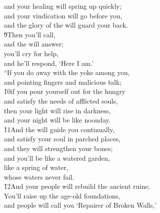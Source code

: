 \begin{poetry}
\poemll    and your healing will spring up quickly; \\
\poeml and your vindication will go before you, \\
\poemll    and the glory of the  will guard your back. \\
\poeml \v{9}Then you'll call, \\
\poemll    and the  will answer; \\
\poeml you'll cry for help, \\
\poemll    and he'll respond, `Here I am.' \\
\poeml ``If you do away with the yoke among you, \\
\poemll    and pointing fingers and malicious talk; \\
\poeml \v{10}if you pour yourself out for the hungry \\
\poemll    and satisfy the needs of afflicted souls, \\
\poeml then your light will rise in darkness, \\
\poemll    and your night will be like noonday. \\
\poeml \v{11}And the  will guide you continually, \\
\poemll    and satisfy your soul in parched places, \\
\poemlll       and they will strengthen your bones; \\
\poeml and you'll be like a watered garden, \\
\poemll    like a spring of water, \\
\poemlll       whose waters never fail. \\
\poeml \v{12}And your people will rebuild the ancient ruins; \\
\poemll    You'll raise up the age-old foundations, \\
\poeml and people will call you `Repairer of Broken Walls,' \\

\end{poetry}
